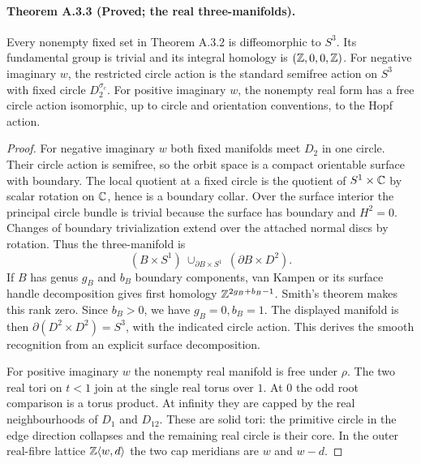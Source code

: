 \paragraph{Theorem A.3.3 (Proved; the real three-manifolds).}
Every nonempty fixed set in Theorem A.3.2 is diffeomorphic to $S^3$.
Its fundamental group is trivial and its integral homology is
$(\mathbb Z,0,0,\mathbb Z)$. For negative imaginary $w$, the restricted circle action
is the standard semifree action on $S^3$ with fixed circle
$D_2^{\sigma_c}$. For positive imaginary $w$, the nonempty real form
has a free circle action isomorphic, up to circle and orientation
conventions, to the Hopf action.

\begin{proof}
For negative imaginary $w$ both fixed manifolds meet $D_2$ in one circle.
Their circle action is semifree, so the orbit space is a compact
orientable surface with boundary. The local quotient at a fixed circle
is the quotient of $S^1\times\mathbb C$ by scalar rotation on $\mathbb C$, hence is
a boundary collar. Over the surface interior the principal circle bundle
is trivial because the surface has boundary and $H^2=0$. Changes of
boundary trivialization extend over the attached normal discs by
rotation. Thus the three-manifold is
\[
 (B\times S^1)\ \cup_{\partial B\times S^1}\ (\partial B\times D^2).
\]
If $B$ has genus $g_B$ and $b_B$ boundary components, van Kampen or its
surface handle decomposition gives first homology
$\mathbb Z^{2g_B+b_B-1}$. Smith's theorem makes this rank zero. Since $b_B>0$,
we have $g_B=0,b_B=1$. The displayed manifold is then
$\partial(D^2\times D^2)=S^3$, with the indicated circle action. This
derives the smooth recognition from an explicit surface decomposition.

For positive imaginary $w$ the nonempty real manifold is free under
$\rho$. The two real tori on $t<1$ join at the single real torus over
$1$. At $0$ the odd root comparison is a torus product. At infinity
they are capped by the real neighbourhoods of $D_1$ and $D_{12}$.
These are solid tori: the primitive circle in the edge direction
collapses and the remaining real circle is their core. In the outer
real-fibre lattice $\mathbb Z\langle w,d\rangle$ the two cap meridians are
$w$ and $w-d$.


\end{proof}
